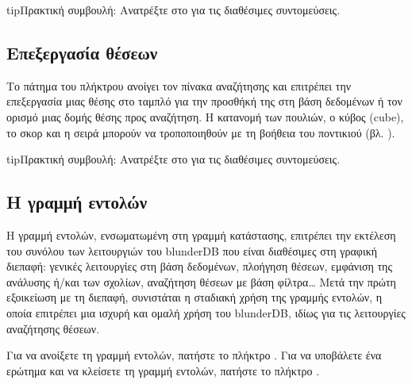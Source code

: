 \documentclass[letterpaper,10pt,greek]{sphinxmanual}
\begin{document}
\begin{sphinxadmonition}{tip}{Πρακτική συμβουλή:}
\sphinxAtStartPar
Ανατρέξτε στο {\hyperref[\detokenize{raccourcis:raccourcis}]{}} για τις διαθέσιμες συντομεύσεις.
\end{sphinxadmonition}


\subsection{Επεξεργασία θέσεων}
\label{\detokenize{manuel:edition-de-positions}}\label{\detokenize{manuel:edition-positions}}
\sphinxAtStartPar
Το πάτημα του πλήκτρου  ανοίγει τον πίνακα αναζήτησης και επιτρέπει την επεξεργασία μιας θέσης στο ταμπλό για την προσθήκή της στη βάση δεδομένων ή τον ορισμό μιας δομής θέσης προς αναζήτηση. Η κατανομή των πουλιών, ο κύβος (cube), το σκορ και η σειρά μπορούν να τροποποιηθούν με τη βοήθεια του ποντικιού (βλ. {\hyperref[\detokenize{guide_utilisateur:guide-edit-position}]{}}).

\begin{sphinxadmonition}{tip}{Πρακτική συμβουλή:}
\sphinxAtStartPar
Ανατρέξτε στο {\hyperref[\detokenize{raccourcis:raccourcis}]{}} για τις διαθέσιμες συντομεύσεις.
\end{sphinxadmonition}


\subsection{Η γραμμή εντολών}
\label{\detokenize{manuel:la-ligne-de-commande}}\label{\detokenize{manuel:ligne-commande}}
\sphinxAtStartPar
Η γραμμή εντολών, ενσωματωμένη στη γραμμή κατάστασης, επιτρέπει την εκτέλεση του συνόλου των λειτουργιών του blunderDB που είναι διαθέσιμες στη γραφική διεπαφή: γενικές λειτουργίες στη βάση δεδομένων, πλοήγηση θέσεων, εμφάνιση της ανάλυσης ή/και των σχολίων, αναζήτηση θέσεων με βάση φίλτρα… Μετά την πρώτη εξοικείωση με τη διεπαφή, συνιστάται η σταδιακή χρήση της γραμμής εντολών, η οποία επιτρέπει μια ισχυρή και ομαλή χρήση του blunderDB, ιδίως για τις λειτουργίες αναζήτησης θέσεων.

\sphinxAtStartPar
Για να ανοίξετε τη γραμμή εντολών, πατήστε το πλήκτρο . Για να υποβάλετε ένα ερώτημα και να κλείσετε τη γραμμή εντολών, πατήστε το πλήκτρο .
\end{document}
